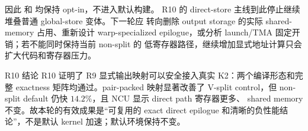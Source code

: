 因此  和
 均保持 opt-in，不进入默认构建。
R10 的 direct-store 主线到此停止继续堆叠普通 global-store 变体。下一轮应
转向删除 output storage 的实际 shared-memory 占用、重新设计 warp-specialized
epilogue，或分析 launch/TMA 固定开销；若不能同时保持当前 non-split 的
低寄存器路径，继续增加显式地址计算只会扩大代码和寄存器压力。

\begin{record}{R10 结论}
R10 证明了 R9 显式输出映射可以安全接入真实 K2：两个编译形态和完整
exactness 矩阵均通过。pair-packed 映射显著改善了 V-split control，但
non-split default 仍快 \(14.2\%\)，且 NCU 显示 direct path 寄存器更多、
shared memory 不变。故本轮的有效成果是“可复用的 exact direct epilogue
和清晰的负性能结论”，不是默认 kernel 加速；默认环境保持不变。
\end{record}
